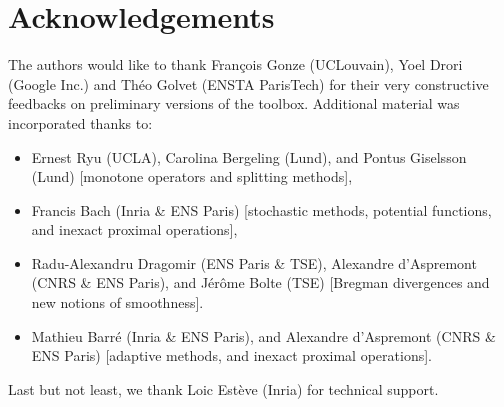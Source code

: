 \documentclass[11pt,a4paper]{article}
\begin{document}
	\section*{Acknowledgements}
	The authors would like to thank Fran\c{c}ois Gonze (UCLouvain), Yoel Drori (Google Inc.) and Th\'eo Golvet (ENSTA ParisTech) for their very constructive feedbacks on preliminary versions of the toolbox.
	Additional material was incorporated thanks to:
	\begin{itemize}
		\item Ernest Ryu (UCLA), Carolina Bergeling (Lund), and Pontus Giselsson (Lund) [monotone operators and splitting methods],
		\item Francis Bach (Inria \& ENS Paris) [stochastic methods, potential functions, and inexact proximal operations],
		\item Radu-Alexandru Dragomir (ENS Paris \& TSE), Alexandre d'Aspremont (CNRS \& ENS Paris), and J\'er\^ome Bolte (TSE) [Bregman divergences and new notions of smoothness].
		\item Mathieu Barr\'e (Inria \& ENS Paris), and Alexandre d'Aspremont (CNRS \& ENS Paris) [adaptive methods, and inexact proximal operations].
	\end{itemize}
	Last but not least, we thank Loic Est\`eve (Inria) for technical support.
\end{document}
